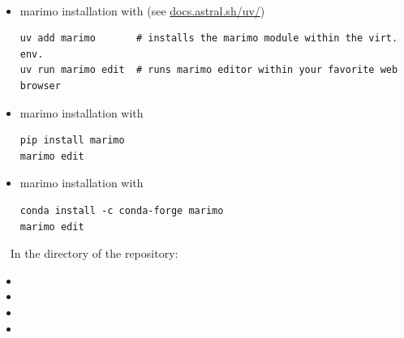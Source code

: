 \documentclass[11pt, serif, mathserif, compress]{beamer}  %
\begin{document}
\begin{frame}[fragile]{}

  \begin {bclogo}[noborder=true, couleur=gray!20, couleurBarre=Chocolate, logo=\raisebox{1mm}{\,\huge{⚙}}, marge=0, margeG=-0.5, margeD=-0.8]
    {\ }
    \smallskip

    \begin{itemize}\setlength\itemsep{3mm}
      
      \item marimo installation with  (see \href{https://docs.astral.sh/uv/}{docs.astral.sh/uv/})
      \begin{verbatim}
uv add marimo       # installs the marimo module within the virt. env.
uv run marimo edit  # runs marimo editor within your favorite web browser
      \end{verbatim}

      \item marimo installation with 
      \begin{verbatim}
pip install marimo
marimo edit
      \end{verbatim}

      \item marimo installation with 
      \begin{verbatim}
conda install -c conda-forge marimo
marimo edit
      \end{verbatim}
    
    \end{itemize}

  \end{bclogo}

\end{frame}

\begin{frame}{}

  \begin {bclogo}[noborder=true, couleur=gray!20, couleurBarre=Chocolate, logo=\raisebox{1mm}{\,\huge{⚙}}, margeG=-0.5, margeD=-0.5]
    {\ }
    \bigskip
    In the  directory of the repository:
    \begin{itemize}\setlength\itemsep{5mm}
    \item {}
    \item {}
    \item {}
    \item {}
    \end{itemize}
  \end{bclogo}

\end{frame}
\end{document}
